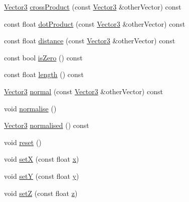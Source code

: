 \begin{DoxyCompactItemize}
\item 
\hyperlink{classprism_1_1geometry_1_1_vector3}{Vector3} \hyperlink{classprism_1_1geometry_1_1_vector3_ad697a4c76c1c852f3b84dfc10a64d74e}{cross\+Product} (const \hyperlink{classprism_1_1geometry_1_1_vector3}{Vector3} \&other\+Vector) const 
\item 
const float \hyperlink{classprism_1_1geometry_1_1_vector3_afbc9f1d2c6c3ec69d8808cafb64f2fa5}{dot\+Product} (const \hyperlink{classprism_1_1geometry_1_1_vector3}{Vector3} \&other\+Vector) const 
\item 
const float \hyperlink{classprism_1_1geometry_1_1_vector3_aa95df074a3d45845019451394af6a648}{distance} (const \hyperlink{classprism_1_1geometry_1_1_vector3}{Vector3} \&other\+Vector) const 
\item 
const bool \hyperlink{classprism_1_1geometry_1_1_vector3_a7a9442d1932c5ebf0860583066bafe3a}{is\+Zero} () const 
\item 
const float \hyperlink{classprism_1_1geometry_1_1_vector3_ab8c5741ae62feae4ee73caea3db763de}{length} () const 
\item 
\hyperlink{classprism_1_1geometry_1_1_vector3}{Vector3} \hyperlink{classprism_1_1geometry_1_1_vector3_a1f5e94a19d0537b9234814c1b6c3263d}{normal} (const \hyperlink{classprism_1_1geometry_1_1_vector3}{Vector3} \&other\+Vector) const 
\item 
void \hyperlink{classprism_1_1geometry_1_1_vector3_a4ef1c2e0f166ef2058232857191e34f1}{normalise} ()
\item 
\hyperlink{classprism_1_1geometry_1_1_vector3}{Vector3} \hyperlink{classprism_1_1geometry_1_1_vector3_ab24c5f1dc1a678ac0641549ee3f081c4}{normalised} () const 
\item 
void \hyperlink{classprism_1_1geometry_1_1_vector3_a36a1687cb1e4c60238db9ad2721c7584}{reset} ()
\item 
void \hyperlink{classprism_1_1geometry_1_1_vector3_ad834c174d4fb3b3f504905b6842e063d}{setX} (const float \hyperlink{classprism_1_1geometry_1_1_vector3_a626b13c89f5ba60b85f8e0b7898efddb}{x})
\item 
void \hyperlink{classprism_1_1geometry_1_1_vector3_a83cfc7282c797f7f43a4040613d69212}{setY} (const float \hyperlink{classprism_1_1geometry_1_1_vector3_aee1ad3f7afd357faa521832508fd1611}{y})
\item 
void \hyperlink{classprism_1_1geometry_1_1_vector3_a22d17255293032faf9aa29cccae269a6}{setZ} (const float \hyperlink{classprism_1_1geometry_1_1_vector3_aed8ff88f798babae79a5ccb706d0b761}{z})
\item 

\end{DoxyCompactItemize}
